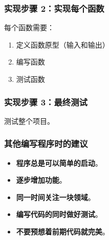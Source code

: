 \documentclass[../../LearnCpp.tex]{subfiles}
\begin{document}
\subsubsection*{实现步骤 2：实现每个函数}

每个函数需要：

\begin{enumerate}
    \item 定义函数原型（输入和输出）
    \item 编写函数
    \item 测试函数
\end{enumerate}

\subsubsection*{实现步骤 3：最终测试}

测试整个项目。

\subsubsection*{其他编写程序时的建议}

\begin{itemize}
    \item \textbf{程序总是可以简单的启动}。
    \item \textbf{逐步增加功能}。
    \item \textbf{同一时间关注一块领域}。
    \item \textbf{编写代码的同时做好测试}。
    \item \textbf{不要预想着前期代码就完美}。
\end{itemize}
\end{document}
